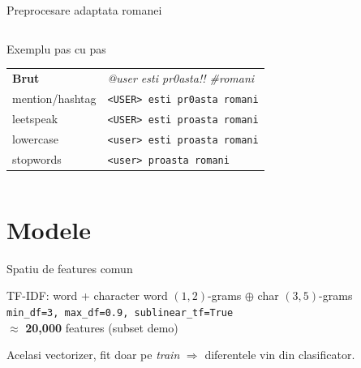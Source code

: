\documentclass[10pt,aspectratio=169]{beamer}
\newcommand{\sub}[1]{{\small\textcolor{ubdark!70}{#1}}}
\begin{document}
\begin{frame}{Preprocesare adaptata romanei}
\vspace{0.6em}
\begin{columns}[T,onlytextwidth]
\begin{exampleblock}{Exemplu pas cu pas}
\footnotesize
\begin{tabularx}{\linewidth}{@{}lX@{}}
\textbf{Brut}        & \textit{@user esti pr0asta!! \#romani} \\
mention/hashtag      & \texttt{<USER> esti pr0asta romani} \\
leetspeak            & \texttt{<USER> esti proasta romani} \\
lowercase            & \texttt{<user> esti proasta romani} \\
stopwords            & \texttt{<user> proasta romani} \\
\end{tabularx}
\end{exampleblock}
\vspace{0.2em}
\end{columns}
\end{frame}

\section{Modele}

\begin{frame}{Spatiu de features comun}
\begin{block}{TF-IDF: word + character}
\centering
word $(1,2)$-grams \quad $\oplus$ \quad char $(3,5)$-grams\\[0.3em]
\sub{\texttt{min\_df=3, max\_df=0.9, sublinear\_tf=True}} \\[0.2em]
$\approx$ \textbf{20{,}000} features (subset demo)
\end{block}
\vspace{0.6em}
\centering Acelasi vectorizer, fit doar pe \emph{train} $\Rightarrow$ \alert{diferentele vin din clasificator.}
\end{frame}
\end{document}
